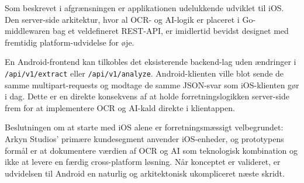 Som beskrevet i afgrænsningen er applikationen udelukkende udviklet til iOS. Den server-side arkitektur, hvor al OCR- og AI-logik er placeret i Go-middlewaren bag et veldefineret REST-API, er imidlertid bevidst designet med fremtidig platform-udvidelse for øje.

En Android-frontend kan tilkobles det eksisterende backend-lag uden ændringer i \texttt{/api/v1/extract} eller \texttt{/api/v1/analyze}. Android-klienten ville blot sende de samme multipart-requests og modtage de samme JSON-svar som iOS-klienten gør i dag. Dette er en direkte konsekvens af at holde forretningslogikken server-side frem for at implementere OCR og AI-kald direkte i klientappen.

Beslutningen om at starte med iOS alene er forretningsmæssigt velbegrundet: Arkyn Studios' primære kundesegment anvender iOS-enheder, og prototypens formål er at dokumentere værdien af OCR og AI som teknologisk kombination og ikke at levere en færdig cross-platform løsning. Når konceptet er valideret, er udvidelsen til Android en naturlig og arkitektonisk ukompliceret næste skridt.
